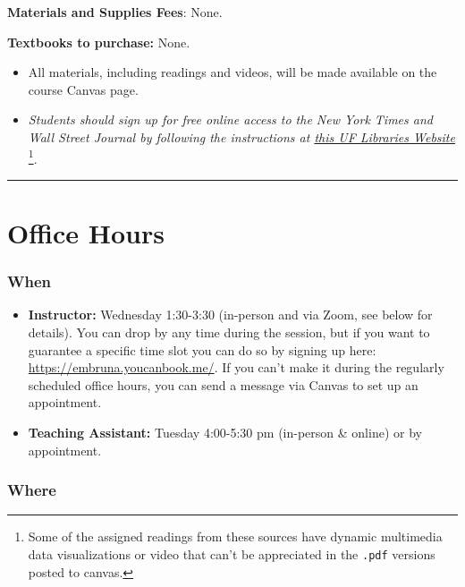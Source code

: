 \documentclass[
  10pt,
  letterpaper,
  oneside,
  open=any]{scrbook}
\begin{document}
\textbf{Materials and Supplies Fees}: None.

\textbf{Textbooks to purchase:} None.

\begin{itemize}
\item
  All materials, including readings and videos, will be made available
  on the course Canvas page. \bigskip
\item
  \emph{Students should sign up for free online access to the New York
  Times and Wall Street Journal by following the instructions at
  \href{https://businesslibrary.uflib.ufl.edu/c.php?g=943928&p=7708734}{this
  UF Libraries Website}} \footnote{Some of the assigned readings from
    these sources have dynamic multimedia data visualizations or video
    that can't be appreciated in the \texttt{.pdf} versions posted to
    canvas.}.
\end{itemize}

\begin{center}\rule{0.5\linewidth}{0.5pt}\end{center}


\chapter{Office Hours}\label{office-hours}

\subsection*{When}\label{when}

\begin{itemize}
\item
  \textbf{Instructor:} Wednesday 1:30-3:30 (in-person and via Zoom, see
  below for details). You can drop by any time during the session, but
  if you want to guarantee a specific time slot you can do so by signing
  up here: \url{https://embruna.youcanbook.me/}. If you can't make it
  during the regularly scheduled office hours, you can send a message
  via Canvas to set up an appointment.
\item
  \textbf{Teaching Assistant:} Tuesday 4:00-5:30 pm (in-person \&
  online) or by appointment.
\end{itemize}

\subsection*{Where}\label{where}
\end{document}
